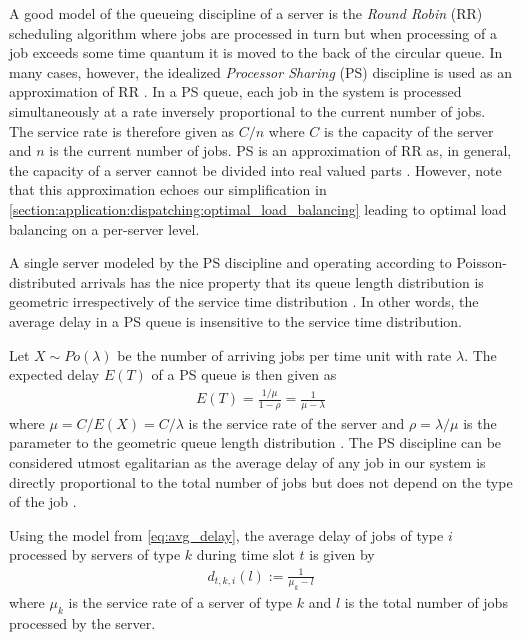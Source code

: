 A good model of the queueing discipline of a server is the \textit{Round Robin} (RR) scheduling algorithm where jobs are processed in turn but when processing of a job exceeds some time quantum it is moved to the back of the circular queue. In many cases, however, the idealized \textit{Processor Sharing} (PS) discipline is used as an approximation of RR \cite{Lin2011, Lin2012}. In a PS queue, each job in the system is processed simultaneously at a rate inversely proportional to the current number of jobs. The service rate is therefore given as $C / n$ where $C$ is the capacity of the server and $n$ is the current number of jobs. PS is an approximation of RR as, in general, the capacity of a server cannot be divided into real valued parts \cite{Virtamo2007}. However, note that this approximation echoes our simplification in \autoref{section:application:dispatching:optimal_load_balancing} leading to optimal load balancing on a per-server level.

A single server modeled by the PS discipline and operating according to Poisson-distributed arrivals has the nice property that its queue length distribution is geometric irrespectively of the service time distribution \cite{Aalto2007}. In other words, the average delay in a PS queue is insensitive to the service time distribution.

Let $X \sim Po(\lambda)$ be the number of arriving jobs per time unit with rate $\lambda$. The expected delay $E(T)$ of a PS queue is then given as \begin{align}\label{eq:avg_delay}
    E(T) = \frac{1/\mu}{1-\rho} = \frac{1}{\mu - \lambda}
\end{align} where $\mu = C / E(X) = C / \lambda$ is the service rate of the server and $\rho = \lambda / \mu$ is the parameter to the geometric queue length distribution \cite{Virtamo2007}. The PS discipline can be considered utmost egalitarian as the average delay of any job in our system is directly proportional to the total number of jobs but does not depend on the type of the job \cite{Virtamo2007}.

Using the model from \autoref{eq:avg_delay}, the average delay of jobs of type $i$ processed by servers of type $k$ during time slot $t$ is given by \begin{align*}
    d_{t,k,i}(l) := \frac{1}{\mu_k - l}
\end{align*} where $\mu_k$ is the service rate of a server of type $k$ and $l$ is the total number of jobs processed by the server.

